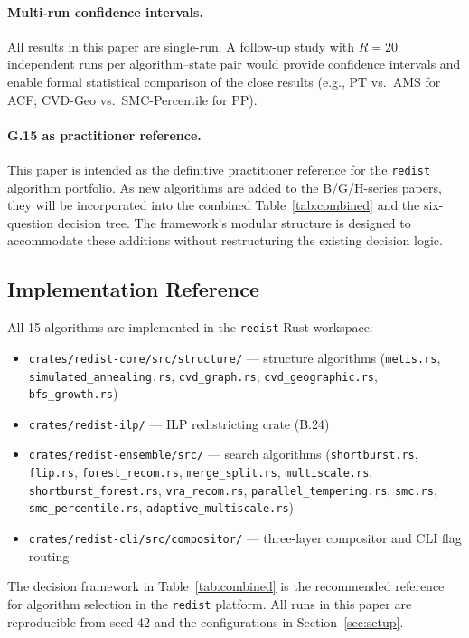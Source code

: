 \paragraph{Multi-run confidence intervals.}
All results in this paper are single-run.
A follow-up study with $R = 20$ independent runs per algorithm--state pair
would provide confidence intervals and enable formal statistical comparison
of the close results (e.g., PT vs.\ AMS for ACF; CVD-Geo vs.\ SMC-Percentile
for PP).

\paragraph{G.15 as practitioner reference.}
This paper is intended as the definitive practitioner reference for the
\texttt{redist} algorithm portfolio.
As new algorithms are added to the B/G/H-series papers, they will be
incorporated into the combined Table~\ref{tab:combined} and the six-question
decision tree.
The framework's modular structure is designed to accommodate these additions
without restructuring the existing decision logic.

\subsection{Implementation Reference}

All 15 algorithms are implemented in the \texttt{redist} Rust workspace:

\begin{itemize}
  \item \texttt{crates/redist-core/src/structure/} --- structure algorithms
        (\texttt{metis.rs}, \texttt{simulated\_annealing.rs},
        \texttt{cvd\_graph.rs}, \texttt{cvd\_geographic.rs},
        \texttt{bfs\_growth.rs})
  \item \texttt{crates/redist-ilp/} --- ILP redistricting crate (B.24)
  \item \texttt{crates/redist-ensemble/src/} --- search algorithms
        (\texttt{shortburst.rs}, \texttt{flip.rs},
        \texttt{forest\_recom.rs}, \texttt{merge\_split.rs},
        \texttt{multiscale.rs}, \texttt{shortburst\_forest.rs},
        \texttt{vra\_recom.rs}, \texttt{parallel\_tempering.rs},
        \texttt{smc.rs}, \texttt{smc\_percentile.rs},
        \texttt{adaptive\_multiscale.rs})
  \item \texttt{crates/redist-cli/src/compositor/} --- three-layer compositor
        and CLI flag routing
\end{itemize}

The decision framework in Table~\ref{tab:combined} is the recommended
reference for algorithm selection in the \texttt{redist} platform.
All runs in this paper are reproducible from seed 42 and the configurations
in Section~\ref{sec:setup}.
